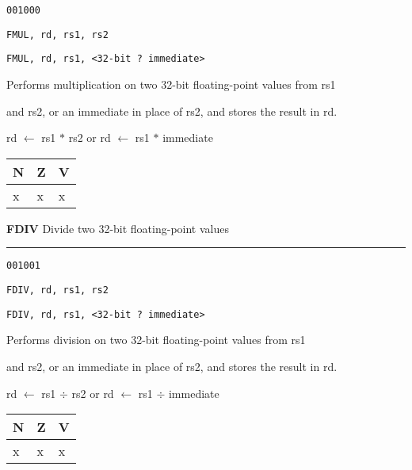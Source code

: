 \documentclass{article}
\begin{document}
{\large
	 \texttt{001000} \par
	\smallbreak
	 \texttt{FMUL, rd, rs1, rs2} \par
	\smallbreak
	 \texttt{FMUL, rd, rs1, <32-bit ? immediate>} \par
	\smallbreak
	 Performs multiplication on two 32-bit floating-point values from rs1 \par
	\makebox[3.5cm][l]{  } and rs2, or an immediate in place of rs2, and stores the result in rd. \par
	\smallbreak
	 rd $\leftarrow$ rs1 $*$ rs2 \quad or \quad rd $\leftarrow$ rs1 $*$ immediate\par
	\smallbreak
	 \begin{tabular}{lll} N \quad & Z \quad & V \\ \hline x & x & x \\ \end{tabular}
}

\bigskip\bigskip

\flushleft
\LARGE\textbf{FDIV} \large \hfill Divide two 32-bit floating-point values

\kern-3pt
\noindent\rule{16.5cm}{0.4pt}
\normalsize

{\large
	 \texttt{001001} \par
	\smallbreak
	 \texttt{FDIV, rd, rs1, rs2} \par
	\smallbreak
	 \texttt{FDIV, rd, rs1, <32-bit ? immediate>} \par
	\smallbreak
	 Performs division on two 32-bit floating-point values from rs1 \par
	\makebox[3.5cm][l]{  } and rs2, or an immediate in place of rs2, and stores the result in rd. \par
	\smallbreak
	 rd $\leftarrow$ rs1 $\div$ rs2 \quad or \quad rd $\leftarrow$ rs1 $\div$ immediate\par
	\smallbreak
	 \begin{tabular}{lll} N \quad & Z \quad & V \\ \hline x & x & x \\ \end{tabular}
}

\bigskip\bigskip
\end{document}
